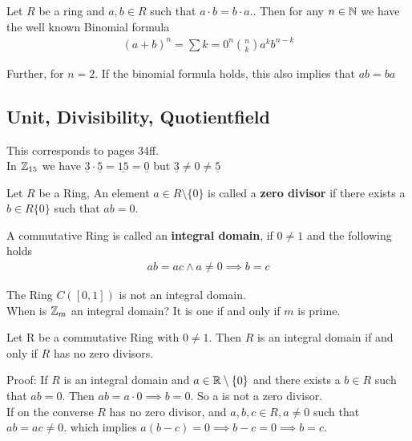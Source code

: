\begin{lemma}[]
	Let $R$ be a ring and $a,b \in R$ such that $a \cdot  b = b \cdot  a$.. Then for any $n \in \mathbb{N}$ we have the well known Binomial formula
	\begin{align*}
					(a + b)^n = \sum{k = 0}^{n} \binom{n}{k} a^k b^{n-k}
	\end{align*}
\end{lemma}
Further, for $n = 2$. If the binomial formula holds, this also implies that $ab = ba$




\subsection{Unit, Divisibility, Quotientfield}
This corresponds to pages 34ff.\\

In $\mathbb{Z}_{15}$ we have $\underline{3} \cdot \underline{5}  = \underline{15}  = \underline{0}$ but $ \underline{3}  \neq 0 \neq \underline{5}$\\

\begin{definition}[]
	Let $R$ be a Ring, An element $a \in R\setminus \{0\}$ is called a \textbf{zero divisor} if there exists a $b \in R \{0\}$ such that $ab = 0$.
\end{definition}




\begin{definition}[]
	A commutative Ring is called an \textbf{integral domain}, if $0 \neq 1$ and the following holds
	\begin{align*}
		ab = ac \land a \neq 0 \implies b = c
	\end{align*}
\end{definition}

The Ring $C([0,1])$ is not an integral domain.\\
When is $\mathbb{Z}_m$ an integral domain? It is one if and only if $m$ is prime.

\begin{lemma}[]
	Let R be a commutative Ring with $0 \neq 1$. Then $R$ is an integral domain if and only if $R$ has no zero divisors.
\end{lemma}
Proof: If $R$ is an integral domain and $a \in \mathbb{R} \setminus \{0\}$ and there exists a $b \in R$ such that $ab = 0$. Then $ab = a \cdot 0 \implies b = 0$. So a is not a zero divisor.\\
If on the converse $R$ has no zero divisor, and $a,b,c \in R, a \neq 0$ such that $ab = ac \neq 0$. which implies $a(b-c) = 0 \implies b-c = 0 \implies b = c$.



